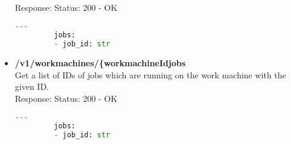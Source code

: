 \begin{itemize}
         Response: Status: 200 - OK
         \begin{lstlisting}[language=Python, caption=Yaml response]
         ---
         jobs:
         - job_id: str
         \end{lstlisting}
      \item \textbf{/v1/workmachines/\{workmachineId\/jobs}\\
         Get a list of IDs of jobs which are running on the work machine with the
given ID.\\
         Response: Status: 200 - OK
         \begin{lstlisting}[language=Python, caption=Yaml response]
         ---
         jobs:
         - job_id: str
         \end{lstlisting}
    \end{itemize}
